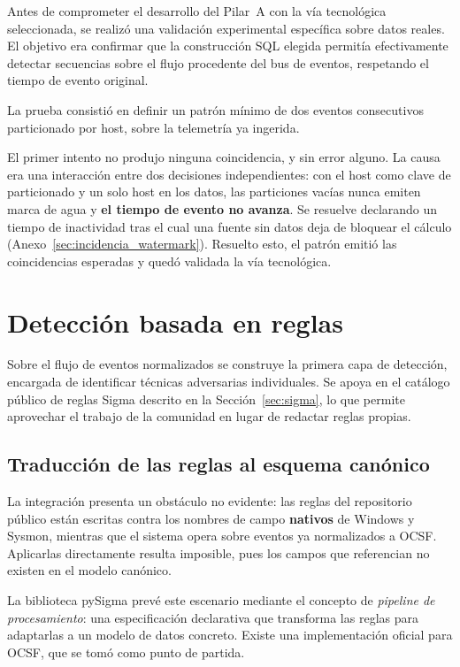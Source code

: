 Antes de comprometer el desarrollo del Pilar~A con la vía tecnológica seleccionada, se realizó
una validación experimental específica sobre datos reales. El objetivo era confirmar que la
construcción SQL elegida permitía efectivamente detectar secuencias sobre el flujo procedente
del bus de eventos, respetando el tiempo de evento original.

La prueba consistió en definir un patrón mínimo de dos eventos consecutivos particionado por
host, sobre la telemetría ya ingerida.

El primer intento no produjo ninguna coincidencia, y sin error alguno. La causa era una
interacción entre dos decisiones independientes: con el host como clave de particionado y un
solo host en los datos, las particiones vacías nunca emiten marca de agua y \textbf{el tiempo de
evento no avanza}. Se resuelve declarando un tiempo de inactividad tras el cual una fuente sin
datos deja de bloquear el cálculo (Anexo~\ref{sec:incidencia_watermark}). Resuelto esto, el
patrón emitió las coincidencias esperadas y quedó validada la vía tecnológica.


\section{Detección basada en reglas}
\label{sec:deteccion-reglas}

Sobre el flujo de eventos normalizados se construye la primera capa de detección, encargada
de identificar técnicas adversarias individuales. Se apoya en el catálogo público de reglas
Sigma descrito en la Sección~\ref{sec:sigma}, lo que permite aprovechar el trabajo de la
comunidad en lugar de redactar reglas propias.

\subsection{Traducción de las reglas al esquema canónico}

La integración presenta un obstáculo no evidente: las reglas del repositorio público están
escritas contra los nombres de campo \textbf{nativos} de Windows y Sysmon, mientras que el
sistema opera sobre eventos ya normalizados a OCSF. Aplicarlas directamente resulta
imposible, pues los campos que referencian no existen en el modelo canónico.

La biblioteca pySigma \cite{pysigma} prevé este escenario mediante el concepto de
\textit{pipeline de procesamiento}: una especificación declarativa que transforma las reglas
para adaptarlas a un modelo de datos concreto. Existe una implementación oficial para OCSF,
que se tomó como punto de partida.

